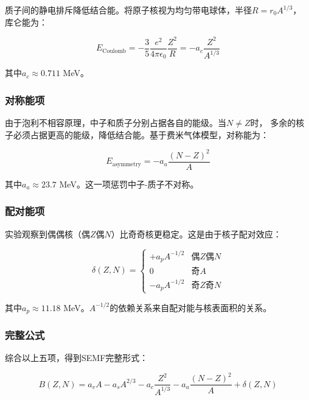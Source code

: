 \documentclass[12pt, a4paper]{article}
\begin{document}
质子间的静电排斥降低结合能。将原子核视为均匀带电球体，半径$R = r_0 A^{1/3}$，
库仑能为：

\begin{equation}
  E_{\text{Coulomb}} = -\frac{3}{5} \frac{e^2}{4\pi\epsilon_0} \frac{Z^2}{R}
  = -a_c \frac{Z^2}{A^{1/3}}
\end{equation}

其中$a_c \approx 0.711$ MeV。

\subsubsection{对称能项}

由于泡利不相容原理，中子和质子分别占据各自的能级。当$N \neq Z$时，
多余的核子必须占据更高的能级，降低结合能。基于费米气体模型，对称能为：

\begin{equation}
  E_{\text{asymmetry}} = -a_a \frac{(N-Z)^2}{A}
\end{equation}

其中$a_a \approx 23.7$ MeV。这一项惩罚中子-质子不对称。

\subsubsection{配对能项}

实验观察到偶偶核（偶$Z$偶$N$）比奇奇核更稳定。这是由于核子配对效应：

\begin{equation}
  \delta(Z, N) = \begin{cases}
    +a_p A^{-1/2} & \text{偶}Z\text{偶}N \\
    0 & \text{奇}A \\
    -a_p A^{-1/2} & \text{奇}Z\text{奇}N
  \end{cases}
\end{equation}

其中$a_p \approx 11.18$ MeV。$A^{-1/2}$的依赖关系来自配对能与核表面积的关系。

\subsubsection{完整公式}

综合以上五项，得到SEMF完整形式：

\begin{equation}
  B(Z, N) = a_v A - a_s A^{2/3} - a_c \frac{Z^2}{A^{1/3}}
            - a_a \frac{(N-Z)^2}{A} + \delta(Z, N)
\end{equation}
\end{document}
